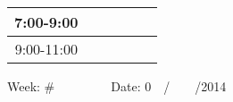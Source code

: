 \documentclass{article}  %
\begin{document}
\begin{table}[!hbp]
\begin{tabular}{|c|c|c|c|c|c|}
\hline
\hline
7:00-9:00   &  &  &  &  & \\
\hline
9:00-11:00  &  &  &  &  & \\
\hline
\hline
\end{tabular}
\end{table}


Week: \#\ \ \ \ \ \ \ \ \  Date: 0\ \ /\ \ \ \ /2014 \\
\begin{table}[!hbp]   %


\end{table}
\end{document}
